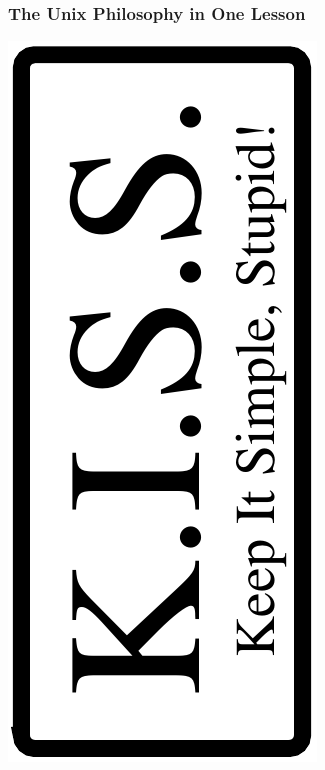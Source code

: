\documentclass[compress]{beamer}
\begin{document}
\begin{frame}
\frametitle{The Unix Philosophy in One Lesson}

\centering\includegraphics[angle=-90,width=0.8\hsize]{kiss.pdf}

\end{frame}
\end{document}
